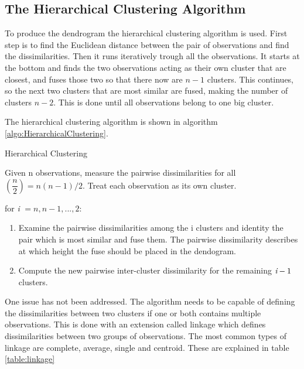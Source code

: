 
\FloatBarrier
\subsection{The Hierarchical Clustering Algorithm}
To produce the dendrogram the hierarchical clustering algorithm is used. First step is to find the Euclidean distance between the pair of observations and find the dissimilarities.
Then it runs iteratively trough all the observations. It starts at the bottom and finds the two observations acting as their own cluster that are closest, and fuses those two so that there now are $n-1$ clusters. This continues, so the next two clusters that are most similar are fused, making the number of clusters $n-2$. This is done until all observations belong to one big cluster.

The hierarchical clustering algorithm is shown in algorithm \ref{algo:HierarchicalClustering}.

\begin{algorithm}
	\caption{Hierarchical Clustering}
	\label{algo:HierarchicalClustering}
	\begin{algorithmic}[1]
 		\State Given n observations, measure the pairwise dissimilarities for all  $(\dfrac{n}{2}) =n(n-1)/2 $. Treat each observation as its own cluster.
 		
 		\State for \emph{i} $= n,n-1,...,2:$
 		\begin{enumerate}[label=(\alph*)]
 			\item Examine the pairwise dissimilarities among the i clusters and identity the pair which is most similar and fuse them. The pairwise dissimilarity describes at which height the fuse should be placed in the dendogram.
 			\item Compute the new pairwise inter-cluster dissimilarity for the remaining $\emph{i}-1$ clusters.
 		\end{enumerate}
 	\end{algorithmic}
 \end{algorithm}

One issue has not been addressed. The algorithm needs to be capable of defining the dissimilarities between two clusters if one or both contains multiple observations. This is done with an extension called linkage which defines dissimilarities between two groups of observations. The most common types of linkage are complete, average, single and
centroid. These are explained in table \ref{table:linkage}

